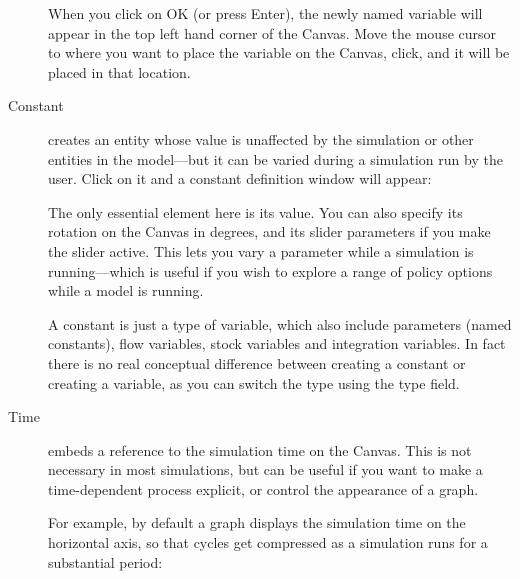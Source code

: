 \begin{description}
When you click on OK (or press Enter), the newly named variable will
appear in the top left hand corner of the Canvas. Move the mouse
cursor to where you want to place the variable on the Canvas, click,
and it will be placed in that location.


\item[Constant]  \label{Constant} creates an entity whose
value is unaffected by the simulation or other entities in the
model---but it can be varied during a simulation run by the
user. Click on it and a constant definition window will appear:

\begin{center}
\end{center}

The only essential element here is its
value. You can also specify its rotation on the Canvas in degrees, and
its slider parameters if you make the slider active. This lets you vary a
parameter while a simulation is running---which is useful if you wish
to explore a range of policy options while a model is running.

A constant is just a type of variable, which also include parameters
(named constants), flow variables, stock variables and integration
variables. In fact there is no real conceptual difference between
creating a constant or creating a variable, as you can switch the type
using the type field.

\item[Time]  embeds a reference to the
simulation time on the Canvas. This is not necessary in most
simulations, but can be useful if you want to make a time-dependent
process explicit, or control the appearance of a graph. 

For example, by default a graph displays the simulation time on the
horizontal axis, so that cycles get compressed as a simulation runs
for a substantial period:

\begin{center}
\end{center}


\end{description}
